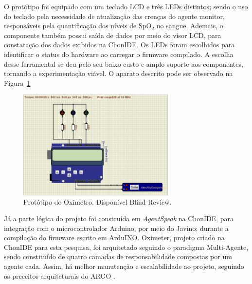 O protótipo foi equipado com um teclado LCD e três LEDs distintos; sendo o uso do teclado pela necessidade de atualização das crenças do agente monitor, responsáveis pela quantificação dos níveis de SpO$_2$ no sangue. Ademais, o componente também possui saída de dados por meio do visor LCD, para constatação dos dados exibidos na ChonIDE. Os LEDs foram escolhidos para identificar o status do hardware ao carregar o firmware compilado.
A escolha desse ferramental se deu pelo seu baixo custo e amplo suporte aos componentes, tornando a experimentação viável. O aparato descrito pode ser observado na Figura~\ref{fig:fig5}

\begin{figure}[H]
  \centering
  \includegraphics[width=0.7\textwidth]{assets/img/Oximeter.png}
  \caption{Protótipo do Oxímetro. Disponível Blind Review.}
  \label{fig:fig5}
\end{figure}

Já a parte lógica do projeto foi construída em \textit{AgentSpeak} na ChonIDE, para integração com o microcontrolador Arduino, por meio do Javino; durante a compilação do firmware escrito em ArduINO. Oximeter, projeto criado na ChonIDE para esta pesquisa, foi arquitetado seguindo o paradigma Multi-Agente, sendo constituído de quatro camadas de responsabilidade compostas por um agente cada. Assim, há melhor manutenção e escalabilidade ao projeto, seguindo os preceitos arquiteturais do ARGO \cite{pantoja2016argo}.

